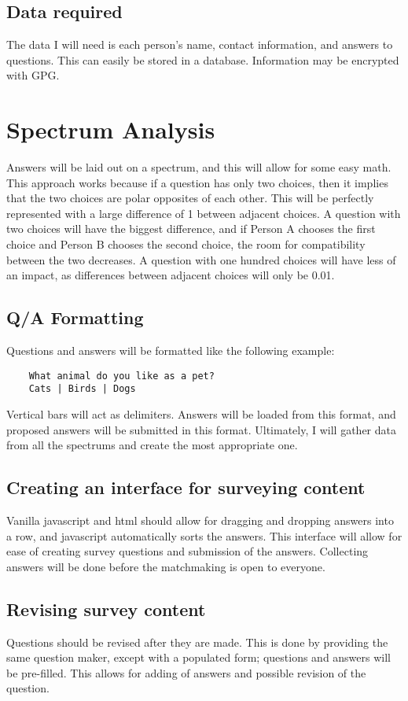 \documentclass[12pt]{article}
\begin{document}
\subsection{Data required}
The data I will need is each person's name, contact information, and answers to
questions. This can easily be stored in a database. Information may be encrypted
with GPG.

\section{Spectrum Analysis}
Answers will be laid out on a spectrum, and this will allow for some easy math.
This approach works because if a question has only two choices, then it implies
that the two choices are polar opposites of each other. This will be perfectly
represented with a large difference of 1 between adjacent choices. A question
with two choices will have the biggest difference, and if Person A chooses the
first choice and Person B chooses the second choice, the room for compatibility
between the two decreases. A question with one hundred choices will have less
of an impact, as differences between adjacent choices will only be 0.01.

\subsection{Q/A Formatting}
Questions and answers will be formatted like the following example:

\begin{verbatim}
    What animal do you like as a pet?
    Cats | Birds | Dogs
\end{verbatim}

Vertical bars will act as delimiters. Answers will be loaded from this format,
and proposed answers will be submitted in this format. Ultimately, I will gather
data from all the spectrums and create the most appropriate one.

\subsection{Creating an interface for surveying content}
Vanilla javascript and html should allow for dragging and dropping answers into
a row, and javascript automatically sorts the answers. This interface will
allow for ease of creating survey questions and submission of the answers.
Collecting answers will be done before the matchmaking is open to everyone.

\subsection{Revising survey content}
Questions should be revised after they are made. This is done by providing the
same question maker, except with a populated form; questions and answers will be
pre-filled. This allows for adding of answers and possible revision of the
question.
\end{document}
